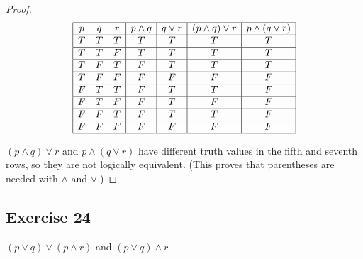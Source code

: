 \documentclass[14pt]{extarticle}
\begin{document}
\begin{proof}
    $$
        \begin{array}{|ccc|c|c|c|c|}
            \hline
            p & q & r & p \wedge q & q \vee r & (p \wedge q) \vee r & p \wedge (q \vee r) \\
            \hline
            T & T & T & T          & T        & T                   & T                   \\
            \hline
            T & T & F & T          & T        & T                   & T                   \\
            \hline
            T & F & T & F          & T        & T                   & T                   \\
            \hline
            T & F & F & F          & F        & F                   & F                   \\
            \hline
            F & T & T & F          & T        & T                   & F                   \\
            \hline
            F & T & F & F          & T        & F                   & F                   \\
            \hline
            F & F & T & F          & T        & T                   & F                   \\
            \hline
            F & F & F & F          & F        & F                   & F                   \\
            \hline
        \end{array}
    $$

    $(p \wedge q) \vee r$ and $p \wedge (q \vee r)$ have different truth values in the fifth and seventh rows, so they are not logically equivalent. (This proves that parentheses are needed with $\wedge$ and $\vee$.)
\end{proof}

\subsection{Exercise 24}
$(p \vee q) \vee (p \wedge r)$ and $(p \vee q) \wedge r$
\end{document}
